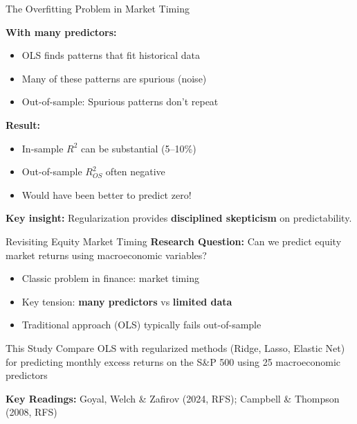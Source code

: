 \documentclass[10pt]{beamer}
\newcommand{\highlight}[1]{\textcolor{AccentOrange}{\textbf{#1}}}
\begin{document}




\begin{frame}{The Overfitting Problem in Market Timing}

\textbf{With many predictors:}
\begin{itemize}
  \item OLS finds patterns that fit historical data
  \item Many of these patterns are spurious (noise)
  \item Out-of-sample: Spurious patterns don't repeat
\end{itemize}

\vspace{1em}
\textbf{Result:}
\begin{itemize}
  \item In-sample $R^2$ can be substantial (5--10\%)
  \item Out-of-sample $R^2_{OS}$ often negative
  \item Would have been better to predict zero!
\end{itemize}

\vspace{1em}
\textbf{Key insight:} Regularization provides \highlight{disciplined skepticism} on predictability.

\end{frame}




\begin{frame}{Revisiting Equity Market Timing}
  \textbf{Research Question:} Can we predict equity market returns using macroeconomic variables?
  
  \vspace{1em}
  \begin{itemize}
    \item Classic problem in finance: market timing
    \item Key tension: \highlight{many predictors} vs \highlight{limited data}
    \item Traditional approach (OLS) typically fails out-of-sample
  \end{itemize}
  
  \vspace{1em}
  \begin{block}{This Study}
    Compare OLS with regularized methods (Ridge, Lasso, Elastic Net) for predicting monthly excess returns on the S\&P 500 using 25 macroeconomic predictors
  \end{block}
  
  \vspace{0.5em}
  \textbf{Key Readings:} Goyal, Welch \& Zafirov (2024, RFS); Campbell \& Thompson (2008, RFS)
\end{frame}
\end{document}

